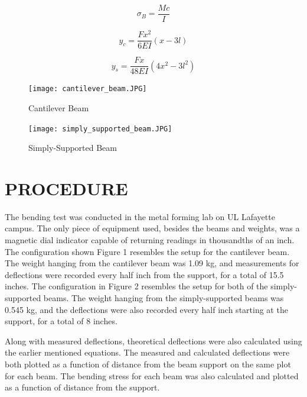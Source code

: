 \documentclass[12pt]{article}
\begin{document}
\begin{equation}
\sigma_{B} = \frac {Mc}{I}
\end{equation}

\bigskip
\begin{equation}
y_{c} = \frac{Fx^2}{6EI}(x-3l)
\end{equation}

\bigskip
\begin{equation}
y_{s} = \frac{Fx}{48EI}(4x^2-3l^2)
\end{equation}
\bigskip


\begin{figure}[h!]  
  \centering
    \texttt{[image: cantilever\_beam.JPG]}
    \caption{Cantilever Beam}
\end{figure}

\newpage

\begin{figure}[h!]  
  \centering
    \texttt{[image: simply\_supported\_beam.JPG]}
    \caption{Simply-Supported Beam}
\end{figure}

\bigskip


\section*{\fontsize{12}{12}\selectfont PROCEDURE}
The bending test was conducted in the metal forming lab on UL Lafayette campus. The only piece of equipment used, besides the beams and weights, was a magnetic dial indicator capable of returning readings in thousandths of an inch. The configuration shown Figure 1 resembles the setup for the cantilever beam. The weight hanging from the cantilever beam was 1.09 kg, and measurements for deflections were recorded every half inch from the support, for a total of 15.5 inches. The configuration in Figure 2 resembles the setup for both of the simply-supported beams. The weight hanging from the simply-supported beams was 0.545 kg, and the deflections were also recorded every half inch starting at the support, for a total of 8 inches.
\bigskip

Along with measured deflections, theoretical deflections were also calculated using the earlier mentioned equations. The measured and calculated deflections were both plotted as a function of distance from the beam support on the same plot for each beam. The bending stress for each beam was also calculated and plotted as a function of distance from the support. 
\bigskip
\end{document}
